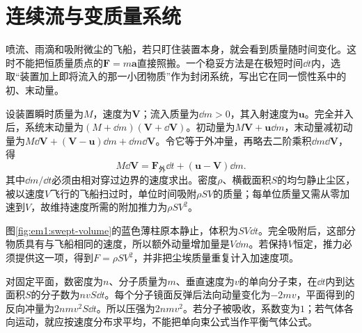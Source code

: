\section{连续流与变质量系统}

喷流、雨滴和吸附微尘的飞船，若只盯住装置本身，就会看到质量随时间变化。这时不能把恒质量质点的$\bm F=m\bm a$直接照搬。一个稳妥方法是在极短时间$\dd t$内，选取“装置加上即将流入的那一小团物质”作为封闭系统，写出它在同一惯性系中的初、末动量。

设装置瞬时质量为$M$，速度为$\bm V$；流入质量为$\dd m>0$，其入射速度为$\bm u$。完全并入后，系统末动量为$(M+\dd m)(\bm V+\dd\bm V)$。初动量为$M\bm V+\bm u\dd m$，末动量减初动量为$M\dd\bm V+(\bm V-\bm u)\dd m+\dd m\dd\bm V$。令它等于外冲量，再略去二阶乘积$\dd m\dd\bm V$，得
\begin{equation}M\dd\bm V=\bm F_{\text{外}}\dd t+(\bm u-\bm V)\dd m.\label{eq:em1:inflow}\end{equation}
其中$\dd m/\dd t$必须由相对穿过边界的速度求出。密度$\rho$、横截面积$S$的均匀静止尘区，被以速度$V$飞行的飞船扫过时，单位时间吸附$\rho SV$的质量；每单位质量又需从零加速到$V$，故维持速度所需的附加推力为$\rho SV^2$。

图\ref{fig:em1:swept-volume}的蓝色薄柱原本静止，体积为$SV\dd t$。完全吸附后，这部分物质具有与飞船相同的速度，所以额外动量增加量是$V\dd m$。若保持$V$恒定，推力必须提供这一项，得到$F=\rho SV^2$，并非把尘埃质量重复计入加速度项。


对固定平面，数密度为$n$、分子质量为$m$、垂直速度为$v$的单向分子束，在$\dd t$内到达面积$S$的分子数为$nvS\dd t$。每个分子镜面反弹后法向动量变化为$-2mv$，平面得到的反向冲量为$2nmv^2S\dd t$。所以压强为$2nmv^2$。若分子被吸收，系数变为$1$；若气体各向运动，就应按速度分布求平均，不能把单向束公式当作平衡气体公式。

